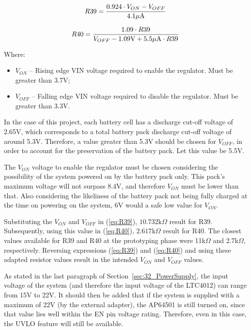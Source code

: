 \begin{equation}\label{eq:R39}
	R39 = \frac{0.924 \cdot V_{ON} - V_{OFF}}{4.1 \mu \textrm{A}}\,\medskip
\end{equation}

\begin{equation}\label{eq:R40}
	R40 = \frac{1.09 \cdot R39}{V_{OFF} - 1.09 \textrm{V} + 5.5 \mu \textrm{A} \cdot R39}\,\medskip
\end{equation}

Where:
\begin{itemize}
	\item $V_{ON}$ -- Rising edge VIN voltage required to enable the regulator. Must be greater than 3.7V;
	\item $V_{OFF}$ -- Falling edge VIN voltage required to disable the regulator. Must be greater than 3.3V.
\end{itemize}

In the case of this project, each battery cell has a discharge cut-off voltage of 2.65V, which corresponds to a total battery pack discharge cut-off voltage of around 5.3V. Therefore, a value greater than 5.3V should be chosen for $V_{OFF}$, in order to account for the preservation of the battery pack. Let this value be 5.5V.

The $V_{ON}$ voltage to enable the regulator must be chosen considering the possibility of the system powered on by the battery pack only. This pack's maximum voltage will not surpass 8.4V, and therefore $V_{ON}$ must be lower than that. Also considering the likeliness of the battery pack not being fully charged at the time on powering on the system, 6V would a safe low value for $V_{ON}$.

Substituting the $V_{ON}$ and $V_{OFF}$ in (\ref{eq:R39}), $10.732$k$\Omega$ result for R39. Subsequently, using this value in (\ref{eq:R40}), $2.617$k$\Omega$ result for R40. The closest values available for R39 and R40 at the prototyping phase were 11k$\Omega$ and 2.7k$\Omega$, respectively. Reversing expressions (\ref{eq:R39}) and (\ref{eq:R40}) and using these adapted resistor values result in the intended $V_{ON}$ and $V_{OFF}$ values.

As stated in the last paragraph of Section~\ref{sec:32_PowerSupply}, the input voltage of the system (and therefore the input voltage of the LTC4012) can range from 15V to 22V. It should then be added that if the system is supplied with a maximum of 22V (by the external adapter), the AP64501 is still turned on, since that value lies well within the EN pin voltage rating. Therefore, even in this case, the UVLO feature will still be available.

